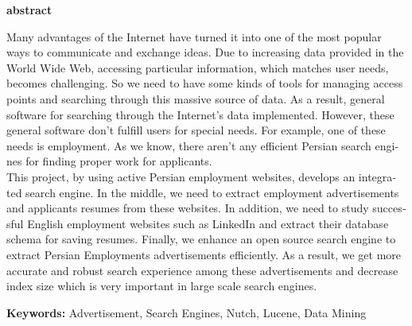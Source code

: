 

\pagestyle{empty}

\begin{latin}

\EnglishAbstractFont

\begin{center}
\textbf{abstract}
\end{center}

Many advantages of the Internet have turned it into one of the most popular ways to communicate and exchange ideas. Due to increasing data provided in the World Wide Web, accessing particular information, which matches user needs, becomes challenging. So we need to have some kinds of tools for managing access points and searching through this massive source of data. As a result, general software for searching through the Internet's data implemented. However, these general software don't fulfill users for special needs. For example, one of these needs is employment. As we know, there aren’t any efficient Persian search engines for finding proper work for applicants.
\\
This project, by using active Persian employment websites, develops an integrated search engine. In the middle, we need to extract employment advertisements and applicants resumes from these websites. In addition, we need to study successful English employment websites such as LinkedIn and extract their database schema for saving resumes. Finally, we enhance an open source search engine to extract Persian Employments advertisements efficiently. As a result, we get more accurate and robust search experience among these advertisements and decrease index size which is very important in large scale search engines.

\textbf{Keywords:} Advertisement, Search Engines, Nutch, Lucene, Data Mining

\end{latin}

\newpage
